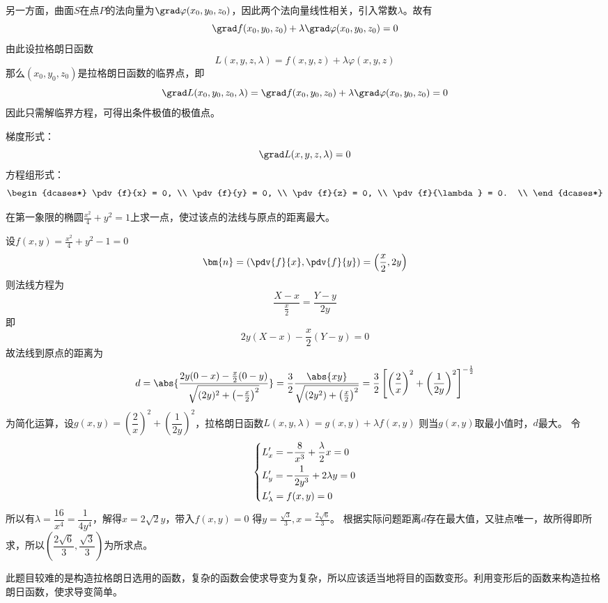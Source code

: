 另一方面，曲面$S$在点$P$的法向量为$\grad\varphi(x_0,y_0,z_0)$，因此两个法向量线性相关，引入常数$\lambda$。故有
\[ \grad f(x_0,y_0,z_0) + \lambda\grad\varphi(x_0,y_0,z_0) = 0 \]
由此设拉格朗日函数
\begin{equation}
    \label{eq:拉格朗日函数}
    L(x,y,z,\lambda) = f(x,y,z) + \lambda\varphi(x,y,z)
\end{equation}
那么$(x_0,y_0,z_0)$是拉格朗日函数的临界点，即
\[ \grad L(x_0,y_0,z_0,\lambda) = \grad f(x_0,y_0,z_0) + \lambda\grad\varphi(x_0,y_0,z_0) = 0 \]
因此只需解临界方程，可得出条件极值的极值点。

梯度形式：
\begin{equation}
    \label{eq:拉格朗日临界方程}
    \grad L(x,y,z,\lambda) = 0
\end{equation}
方程组形式：
\begin{equation}
    \begin{dcases*}
        \pdv{f}{x} = 0,       \\
        \pdv{f}{y} = 0,       \\
        \pdv{f}{z} = 0,       \\
        \pdv{f}{\lambda} = 0. \\
    \end{dcases*}
\end{equation}

\begin{example}
    在第一象限的椭圆$\frac{x^2}{4} + y^2 = 1$上求一点，使过该点的法线与原点的距离最大。
\end{example}
\begin{solution}
    设$f(x,y) = \frac{x^2}{4} + y^2 - 1 = 0$
    \[ \bm{n} = \left(\pdv{f}{x}, \pdv{f}{y}\right) = \left(\frac{x}{2}, 2y\right) \]
    则法线方程为
    \[ \frac{X - x}{\frac{x}{2}} = \frac{Y - y}{2y} \]
    即
    \[ 2y(X-x)-\frac{x}{2}(Y-y) = 0 \]
    故法线到原点的距离为
    \[
        d
        = \abs{\frac{2y(0-x)-\frac{x}{2}(0-y)}{\sqrt{(2y)^2 + \left(-\frac{x}{2}\right)^2}}}
        = \frac{3}{2}\frac{\abs{xy}}{\sqrt{(2y^2)+\left(\frac{x}{2}\right)^2}}
        = \frac{3}{2} \left[\left(\frac{2}{x}\right)^2 + \left(\frac{1}{2y}\right)^2\right]^{-\frac{1}{2}}
    \]
    为简化运算，设$g(x,y) = (\dfrac{2}{x})^2 + (\dfrac{1}{2y})^2$，拉格朗日函数$L(x,y,\lambda) = g(x,y) + \lambda f(x,y)$
    则当$g(x,y)$取最小值时，$d$最大。
    令
    \[
        \begin{dcases}
            L'_x = -\frac{8}{x^3} + \frac{\lambda}{2} x = 0 \\
            L'_y = -\frac{1}{2y^3} + 2\lambda y = 0         \\
            L'_\lambda = f(x,y)=0
        \end{dcases}
    \]
    所以有$\lambda = \dfrac{16}{x^4} = \dfrac{1}{4y^4}$，解得$x=2\sqrt{2}y$，带入$f(x,y)=0$
    得$y = \frac{\sqrt{3}}{3},x=\frac{2\sqrt{6}}{3}$。
    根据实际问题距离$d$存在最大值，又驻点唯一，故所得即所求，所以$\left(\dfrac{2\sqrt{6}}{3}, \dfrac{\sqrt{3}}{3}\right)$为所求点。
\end{solution}

此题目较难的是构造拉格朗日选用的函数，复杂的函数会使求导变为复杂，所以应该适当地将目的函数变形。利用变形后的函数来构造拉格朗日函数，使求导变简单。